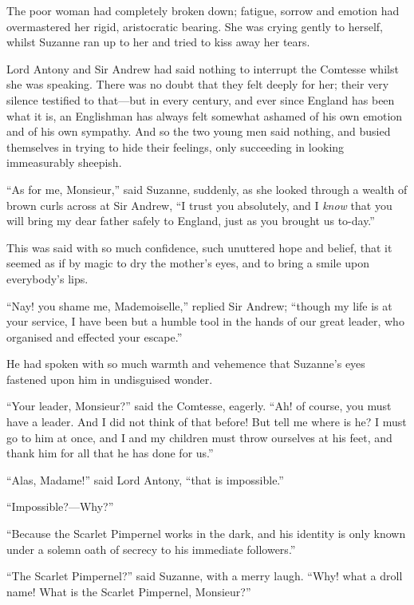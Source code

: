 \documentclass[paper=5.5in:8.5in,BCOR=7mm,twoside,DIV=calc,12pt,usegeometry,chapterprefix,endperiod,headings=big]{scrbook}
\begin{document}
The poor woman had completely broken down; fatigue, sorrow and emotion had overmastered her rigid, aristocratic bearing. She was crying gently to herself, whilst Suzanne ran up to her and tried to kiss away her tears.

Lord Antony and Sir Andrew had said nothing to interrupt the Comtesse whilst she was speaking. There was no doubt that they felt deeply for her; their very silence testified to that---but in every century, and ever since England has been what it is, an Englishman has always felt somewhat ashamed of his own emotion and of his own sympathy. And so the two young men said nothing, and busied themselves in trying to hide their feelings, only succeeding in looking immeasurably sheepish.

\enquote{As for me, Monsieur,} said Suzanne, suddenly, as she looked through a wealth of brown curls across at Sir Andrew, \enquote{I trust you absolutely, and I \textit{know} that you will bring my dear father safely to England, just as you brought us to-day.}

This was said with so much confidence, such unuttered hope and belief, that it seemed as if by magic to dry the mother's eyes, and to bring a smile upon everybody's lips.

\enquote{Nay! you shame me, Mademoiselle,} replied Sir Andrew; \enquote{though my life is at your service, I have been but a humble tool in the hands of our great leader, who organised and effected your escape.}

He had spoken with so much warmth and vehemence that Suzanne's eyes fastened upon him in undisguised wonder.

\enquote{Your leader, Monsieur?} said the Comtesse, eagerly. \enquote{Ah! of course, you must have a leader. And I did not think of that before! But tell me where is he? I must go to him at once, and I and my children must throw ourselves at his feet, and thank him for all that he has done for us.}

\enquote{Alas, Madame!} said Lord Antony, \enquote{that is impossible.}

\enquote{Impossible?---Why?}

\enquote{Because the Scarlet Pimpernel works in the dark, and his identity is only known under a solemn oath of secrecy to his immediate followers.}

\enquote{The Scarlet Pimpernel?} said Suzanne, with a merry laugh. \enquote{Why! what a droll name! What is the Scarlet Pimpernel, Monsieur?}
\end{document}
